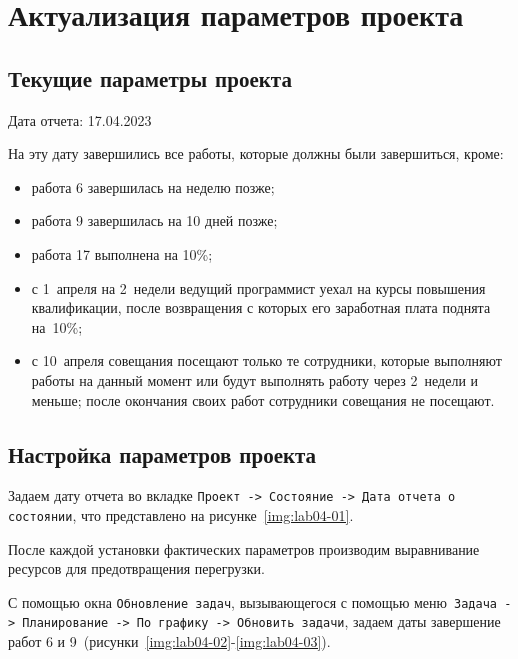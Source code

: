 \clearpage
\section{Актуализация параметров проекта}

\subsection{Текущие параметры проекта}

Дата отчета: 17.04.2023

На эту дату завершились все работы, которые должны были завершиться, кроме:

\begin{itemize}
    \item работа 6 завершилась на неделю позже;
    \item работа 9 завершилась на 10 дней позже;
    \item работа 17 выполнена на 10\%;
    \item с 1~апреля на 2~недели ведущий программист уехал на курсы повышения
	  квалификации, после возвращения с которых его заработная плата
	  поднята на~10\%;
    \item с 10~апреля совещания посещают только те сотрудники, которые
        выполняют работы на данный момент или будут выполнять работу через
        2~недели и меньше; после окончания своих работ сотрудники совещания не
        посещают.
\end{itemize}

\subsection{Настройка параметров проекта}

Задаем дату отчета во вкладке \texttt{Проект -> Состояние -> Дата отчета о
состоянии}, что представлено на рисунке~\ref{img:lab04-01}.


После каждой установки фактических параметров производим выравнивание ресурсов
для предотвращения перегрузки.

С помощью окна \texttt{Обновление задач}, вызывающегося с помощью
меню~\texttt{Задача -> Планирование -> По графику -> Обновить задачи}, задаем
даты завершение работ 6 и 9~(рисунки~\ref{img:lab04-02}-\ref{img:lab04-03}).


